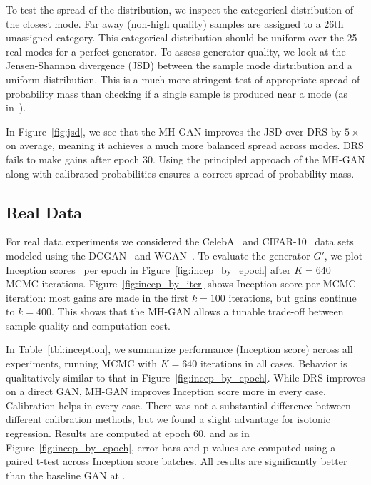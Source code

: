 \documentclass{article}
\begin{document}
To test the spread of the distribution, we inspect the categorical distribution of the closest mode.
Far away (non-high quality) samples are assigned to a 26th unassigned category.
This categorical distribution should be uniform over the 25 real modes for a perfect generator.
To assess generator quality, we look at the Jensen-Shannon divergence (JSD) between the sample mode distribution and a uniform distribution.
This is a much more stringent test of appropriate spread of probability mass than checking if a single sample is produced near a mode (as in~\citet{Azadi2018})\@.




In Figure~\ref{fig:jsd}, we see that the MH-GAN improves the JSD over DRS by $5 \times$ on average, meaning it achieves a much more balanced spread across modes.
DRS fails to make gains after epoch 30.
Using the principled approach of the MH-GAN along with calibrated probabilities ensures a correct spread of probability mass.

\subsection{Real Data}

For real data experiments we considered the CelebA~\citep{Liu2015} and CIFAR-10~\citep{Torralba2008} data sets modeled using the DCGAN~\citep{Radford2015} and WGAN~\citep{Arjovsky2017, Gulrajani2017}.
To evaluate the generator $G'$, we plot Inception scores~\citep{Salimans2016} per epoch in Figure~\ref{fig:incep_by_epoch} after $K=640$ MCMC iterations.
Figure~\ref{fig:incep_by_iter} shows Inception score per MCMC iteration:
most gains are made in the first $k=100$ iterations, but gains continue to $k=400$.
This shows that the MH-GAN allows a tunable trade-off between sample quality and computation cost.




In Table~\ref{tbl:inception}, we summarize performance (Inception score) across all experiments, running MCMC with $K=640$ iterations in all cases.
Behavior is qualitatively similar to that in Figure~\ref{fig:incep_by_epoch}.
While DRS improves on a direct GAN, MH-GAN improves Inception score more in every case.
Calibration helps in every case.
There was not a substantial difference between different calibration methods, but we found a slight advantage for isotonic regression.
Results are computed at epoch 60, and as in Figure~\ref{fig:incep_by_epoch}, error bars and p-values are computed using a paired t-test across Inception score batches.
All results are significantly better than the baseline GAN at .
\end{document}

